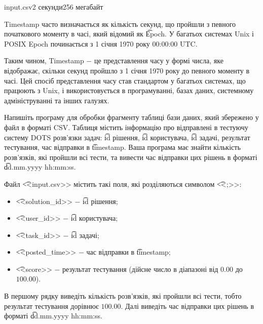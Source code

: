 \begin{problem}{}{input.csv}{}{2 секунди}{256 мегабайт}

Timestamp часто визначається як кількість секунд, що пройшли з певного початкового моменту в часі, який відомий як \t{Epoch}. 
У багатьох системах Unix і POSIX Epoch починається з 1 січня 1970 року 00:00:00 UTC.

Таким чином, Timestamp $-$ це представлення часу у формі числа, яке відображає, 
скільки секунд пройшло з 1 січня 1970 року до певного моменту в часі. 
Цей спосіб представлення часу став стандартом у багатьох системах, що працюють з Unix, 
і використовується в програмуванні, базах даних, системному адмініструванні та інших галузях.

Напишіть програму для обробки фрагменту таблиці бази даних, який збережено у файл в форматі CSV.
Таблиця містить інформацію про відправлені в тестуючу систему DOTS розв'язки задач: 
\t{id} рішення, \t{id} користувача, \t{id} задачі, результат тестування, час відправки в \t{timestamp}.
Ваша програма має знайти кількість розв'язків, які пройшли всі тести, та вивести час відправки цих рішень в форматі
\t{dd.mm.yyyy hh:mm:ss}.

\InputFile
Файл \t{<<input.csv>>} містить такі поля, які розділяються символом \t{<<;>>}:
\begin{itemize}
  \setlength\itemsep{0em}
  \item \t{<<solution\_id>>} $-$ \t{id} рішення;
  \item \t{<<user\_id>>} $-$ \t{id} користувача;
  \item \t{<<task\_id>>} $-$ \t{id} задачі;
  \item \t{<<posted\_time>>} $-$ час відправки в \t{timestamp};
  \item \t{<<score>>} $-$ результат тестування (дійсне число в діапазоні від $0.00$ до $100.00$). 
\end{itemize}

\OutputFile
В першому рядку виведіть кількість розв'язків, які пройшли всі тести, тобто результат тестування дорівнює $100.00$.
Далі виведіть час відправки цих рішень в форматі \t{dd.mm.yyyy hh:mm:ss}.

\Example
\begin{example}
%
\end{example}

\end{problem}

